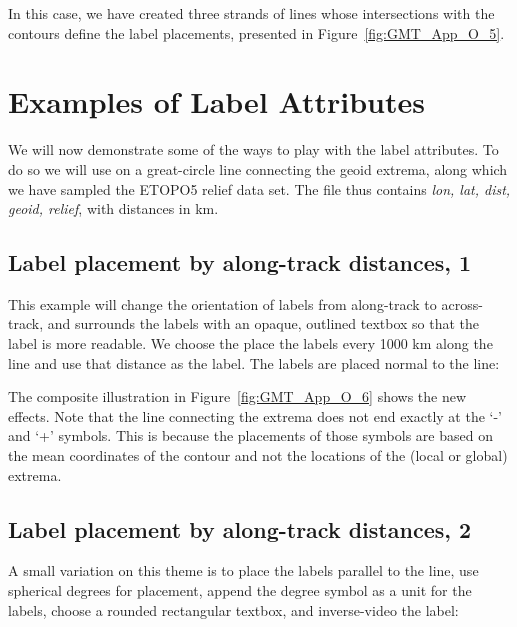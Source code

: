 


\noindent
In this case, we have created three strands of lines whose intersections with the contours
define the label placements, presented in Figure~\ref{fig:GMT_App_O_5}.

\section{Examples of Label Attributes}

We will now demonstrate some of the ways to play with the label attributes.  To do so we
will use  on a great-circle line connecting the geoid extrema, along which
we have sampled the ETOPO5 relief data set.  The file  thus contains
{\it lon, lat, dist, geoid, relief}, with distances in km.

\subsection{Label placement by along-track distances, 1}

This example will change the orientation of labels from along-track to across-track, and
surrounds the labels with an opaque, outlined textbox so that the label is more readable.  We choose
the place the labels every 1000 km along the line and use that distance as the label.  The
labels are placed normal to the line:




\noindent
The composite illustration in Figure~\ref{fig:GMT_App_O_6} shows the new effects.  Note that
the line connecting the extrema does not end exactly at the `-' and `+' symbols.  This is
because the placements of those symbols are based on the mean coordinates of the contour and
not the locations of the (local or global) extrema.

\subsection{Label placement by along-track distances, 2}

A small variation on this theme is to place the labels parallel to the line, use
spherical degrees for placement, append the degree symbol as a unit for the
labels, choose a rounded rectangular textbox, and inverse-video the label:

